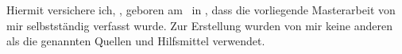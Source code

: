 
\begin{eidesstaatliche-erklaerung}

Hiermit versichere ich, \Author, geboren am \Birthday ~in \Birthplace, dass die vorliegende Masterarbeit von mir selbstst\"andig verfasst wurde. Zur Erstellung wurden von mir keine anderen als die genannten Quellen und Hilfsmittel verwendet.

\end{eidesstaatliche-erklaerung}